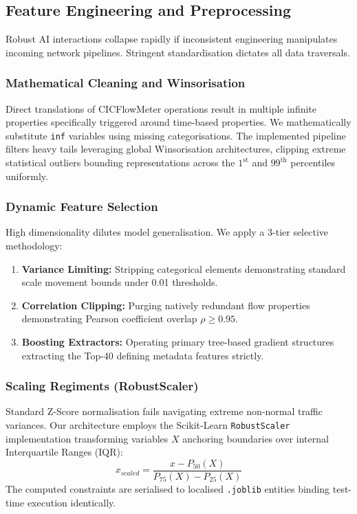 \documentclass[conference]{IEEEtran}
\begin{document}
\subsection{Feature Engineering and Preprocessing}
Robust AI interactions collapse rapidly if inconsistent engineering manipulates incoming network pipelines. Stringent standardisation dictates all data traversals.

\subsubsection{Mathematical Cleaning and Winsorisation}
Direct translations of CICFlowMeter operations result in multiple infinite properties specifically triggered around time-based properties. We mathematically substitute \texttt{inf} variables using missing categorisations. The implemented pipeline filters heavy tails leveraging global Winsorisation architectures, clipping extreme statistical outliers bounding representations across the $1^{\text{st}}$ and $99^{\text{th}}$ percentiles uniformly.

\subsubsection{Dynamic Feature Selection}
High dimensionality dilutes model generalisation. We apply a 3-tier selective methodology:
\begin{enumerate}
    \item \textbf{Variance Limiting:} Stripping categorical elements demonstrating standard scale movement bounds under 0.01 thresholds.
    \item \textbf{Correlation Clipping:} Purging natively redundant flow properties demonstrating Pearson coefficient overlap $\rho \geq 0.95$.
    \item \textbf{Boosting Extractors:} Operating primary tree-based gradient structures extracting the Top-40 defining metadata features strictly.
\end{enumerate}

\subsubsection{Scaling Regiments (RobustScaler)}
Standard Z-Score normalisation fails navigating extreme non-normal traffic variances. Our architecture employs the Scikit-Learn \texttt{RobustScaler} implementation transforming variables $X$ anchoring boundaries over internal Interquartile Ranges (IQR):
\begin{equation}
    x_{scaled} = \frac{x - P_{50}(X)}{P_{75}(X) - P_{25}(X)}
\end{equation}
The computed constraints are serialised to localised \texttt{.joblib} entities binding test-time execution identically.
\end{document}
